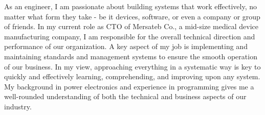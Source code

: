 \documentclass[10pt,a4paper,ragged2e,withhyper]{altacv}
\begin{document}

\makecvheader



\begin{paracol}{2}

{\justifying \noindent As an engineer, I am passionate about building systems that work effectively, no matter what form they take - be it devices, software, or even a company or group of friends. In my current role as CTO of Mersateb Co., a mid-size medical device manufacturing company, I am responsible for the overall technical direction and performance of our organization. A key aspect of my job is implementing and maintaining standards and management systems to ensure the smooth operation of our business. In my view, approaching everything in a systematic way is key to quickly and effectively learning, comprehending, and improving upon any system. My background in power electronics and experience in programming gives me a well-rounded understanding of both the technical and business aspects of our industry. \par}

\divider
{}









\end{paracol}
\end{document}
